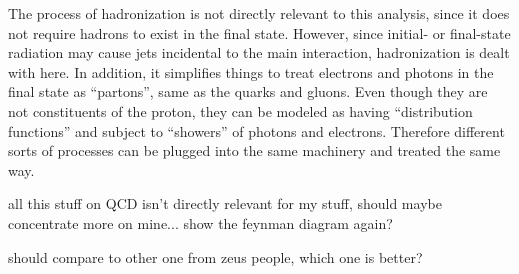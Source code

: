 The process of hadronization is not directly 
relevant to this analysis, 
since it does not require hadrons to 
exist in the final state.  
However, since initial- or final-state radiation 
may cause jets incidental to the main interaction, 
hadronization is dealt with here.  
In addition, it simplifies things to treat 
electrons and photons in the final state as ``partons'', 
same as the quarks and gluons.  
Even though they are not constituents of the proton, 
they can be modeled as having 
``distribution functions'' 
and subject to ``showers'' of 
photons and electrons. 
Therefore different sorts of processes can be 
plugged into the same machinery and treated the same way.  

all this stuff on QCD isn't directly relevant for my 
stuff, should maybe concentrate more on mine... 
show the feynman diagram again?  



should compare to other one from zeus people, which one is better? 

